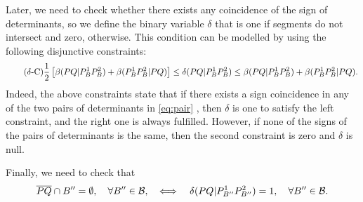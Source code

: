 \documentclass[a4paper,  review, authoryear, 1p.]{elsarticle}
\newcommand{\B}{{\mathcal B}}
\newcommand{\ES}{{E^{}_{S}}}
\newcommand{\segment}[2]{\overline{#1#2}}
\newcommand{\determinant}[3]{\det({#1|#2#3})}
\begin{document}
		Later, we need to check whether there exists any coincidence of the sign of determinants, so we define the binary variable $\delta$ that is one if segments do not intersect and zero, otherwise. This condition can be modelled by using the following disjunctive constraints:
		\begin{equation*}\tag{$\delta$-C}\label{eq:deltaC}
			\frac{1}{2}\left[\beta(PQ|P_B^1P_B^2)+\beta(P_B^1P_B^2|PQ)\right]\leq\delta(PQ|P_B^1P_B^2)\leq \beta(PQ|P_B^1P_B^2)+\beta(P_B^1P_B^2|PQ).
		\end{equation*}
		Indeed, the above constraints state that if there exists a sign coincidence in any of the two pairs of determinants in \eqref{eq:pair} , then $\delta$ is one to satisfy the left constraint, and the right one is always fulfilled. However, if none of the signs of the pairs of determinants is the same, then the second constraint is zero and $\delta$ is null.
		
		Finally, we need to check that
		$$\overline{PQ}\cap B''=\emptyset,\quad \forall B''\in\B,\quad\Longleftrightarrow\quad \deltacheck{P}{Q}{P_{B''}^1}{P_{B''}^2}=1,\quad\forall B''\in\B.$$
		
		
		\newcommand{\varepsilonvar}[2]{\varepsilon(#1#2)}
		
\end{document}

